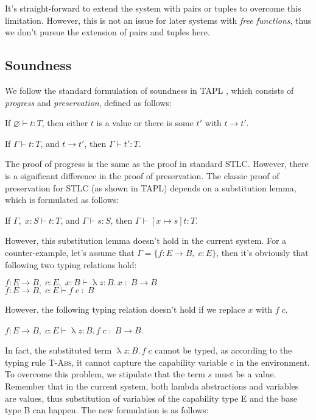 It's straight-forward to extend the system with pairs or tuples to
overcome this limitation. However, this is not an issue for later
systems with \emph{free functions}, thus we don't pursue the extension
of pairs and tuples here.

\subsection{Soundness}

\label{sec:stlc-pure-soundness}

We follow the standard formulation of soundness in TAPL
\cite{bpierce2002types}, which consists of \emph{progress} and
\emph{preservation}, defined as follows:

\begin{theorem}[Progress]
If $\varnothing \vdash t : T$, then either $t$ is a value or there is some
$t'$ with $t \longrightarrow t'$.
\end{theorem}

\begin{theorem}[Preservation]
If $\Gamma \vdash t : T$, and $t \longrightarrow t'$, then $\Gamma
\vdash t' : T$.
\end{theorem}

The proof of progress is the same as the proof in standard
STLC. However, there is a significant difference in the proof of
preservation. The classic proof of preservation for STLC (as shown in
TAPL) depends on a substitution lemma, which is formulated as follows:

\begin{lemma}
If $\Gamma,\; x:S \vdash t : T$, and $\Gamma \vdash s : S$, then $\Gamma
\vdash [x \mapsto s]t : T$.
\end{lemma}

However, this substitution lemma doesn't hold in the current
system. For a counter-example, let's assume that
$\Gamma = \{f: E \to B,\; c:E\}$, then it's obviously that following
two typing relations hold:

$f: E \to B,\; c:E,\; x:B \vdash \uplambda z{:}B.\,x \; : \; B \to B$ \\
$f: E \to B,\; c:E \vdash f \; c \; : \; B$

However, the following typing relation doesn't hold if we replace $x$
with $f \; c$.

$f: E \to B,\; c:E \vdash \uplambda z{:}B.\,f \; c \; : \; B \to B$.

In fact, the substituted term $\uplambda z{:}B.\,f \; c$ cannot be
typed, as according to the typing rule \textsc{T-Abs}, it cannot
capture the capability variable $c$ in the environment. To overcome
this problem, we stipulate that the term $s$ must be a value. Remember
that in the current system, both lambda abstractions and variables are
values, thus substitution of variables of the capability type E and
the base type B can happen. The new formulation is as follows:


